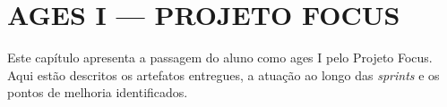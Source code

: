 \chapter[AGES I --- Projeto Focus]{AGES I --- PROJETO FOCUS}

Este capítulo apresenta a passagem do aluno como \ac{ages} I pelo Projeto Focus. Aqui estão descritos os artefatos entregues, a atuação ao longo das \textit{sprints} e os pontos de melhoria identificados.




